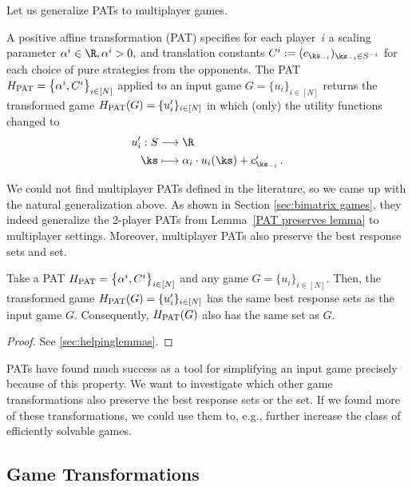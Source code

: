 Let us generalize PATs to multiplayer games.
\begin{defn}
\label{multiplayer PAT defn}
A positive affine transformation (PAT) specifies for each player~$i$ a scaling parameter $\alpha^i \in \R, \alpha^i >0,$ and translation constants $C^i := ( c_{\ks_{-i}})_{\ks_{-i} \in S^{-i}}$ for each choice of pure strategies from the opponents. 
The PAT $H_{\textnormal{PAT}} = \big\{ \alpha^i, C^i \big\}_{i \in [N]}$ applied to an input game $G = \{u_i\}_{i \in [N]}$ returns the transformed game $H_{\textnormal{PAT}}(G) = \{u_i'\}_{i \in [N]}$ in which (only) the utility functions changed to
\begin{align}
\label{PAT transformed utilities}
\begin{aligned}
u_i' : S &\longrightarrow \R \\
\ks &\longmapsto \alpha_i \cdot u_i(\ks) + c_{\ks_{-i}}^i \, .
\end{aligned}
\end{align}
\end{defn}
We could not find multiplayer PATs defined in the literature, so we came up with the natural generalization above. As shown in Section \ref{sec:bimatrix games}, they indeed generalize the 2-player PATs from Lemma~\ref{PAT preserves lemma} to multiplayer settings. Moreover, multiplayer PATs also preserve the best response sets and \NE{} set.
\begin{lemma}
\label{multiplayer PAT preserves}
Take a PAT $H_{\textnormal{PAT}} = \big\{ \alpha^i, C^i \big\}_{i \in [N]}$ and any game $G = \{u_i\}_{i \in [N]}$. Then, the transformed game $H_{\textnormal{PAT}}(G) = \{u_i'\}_{i \in [N]}$ has the same best response sets as the input game $G$. Consequently, $H_{\textnormal{PAT}}(G)$ also has the same \NE{} set as $G$.
\end{lemma}
\begin{proof}
See \ref{sec:helpinglemmas}.
\end{proof}
PATs have found much success as a tool for simplifying an input game precisely because of this property. We want to investigate which other game transformations also preserve the best response sets or the \NE{} set. If we found more of these transformations, we could use them to, e.g., further increase the class of efficiently solvable games.

\subsection{Game Transformations}

